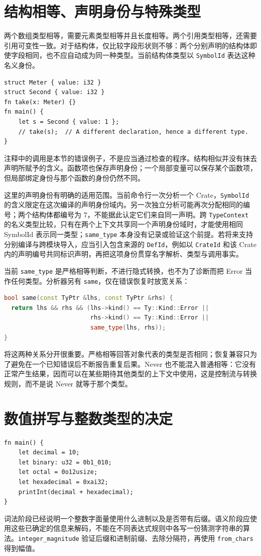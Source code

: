 \section{结构相等、声明身份与特殊类型}
两个数组类型相等，需要元素类型相等并且长度相等。两个引用类型相等，还需要引用可变性一致。对于结构体，仅比较字段形状则不够：两个分别声明的结构体即使字段相同，也不应自动成为同一种类型。当前结构体类型以 \texttt{SymbolId} 表达这种名义身份。

\begin{lstlisting}[language=Rustless]
struct Meter { value: i32 }
struct Second { value: i32 }
fn take(x: Meter) {}
fn main() {
    let s = Second { value: 1 };
    // take(s);  // A different declaration, hence a different type.
}
\end{lstlisting}
注释中的调用是本节的错误例子，不是应当通过检查的程序。结构相似并没有抹去声明所赋予的含义。函数项也保存声明身份；一个局部变量可以保存某个函数项，但局部绑定身份与那个函数的身份仍然不同。

这里的声明身份有明确的适用范围。当前命令行一次分析一个 Crate，\texttt{SymbolId} 的含义限定在这次编译的声明身份域内。另一次独立分析可能再次分配相同的编号；两个结构体都编号为 7，不能据此认定它们来自同一声明。跨 \texttt{TypeContext} 的名义类型比较，只有在两个上下文共享同一个声明身份域时，才能使用相同 SymbolId 表示同一类型；\texttt{same\_type} 本身没有记录或验证这个前提。若将来支持分别编译与跨模块导入，应当引入包含来源的 \texttt{DefId}，例如以 \texttt{CrateId} 和该 Crate 内的声明编号共同标识声明，再把这项身份贯穿名字解析、类型与调用事实。

当前 \texttt{same\_type} 是严格相等判断，不进行隐式转换，也不为了诊断而把 Error 当作任何类型。分析器另有 \texttt{same}，仅在错误恢复时放宽关系：
\begin{lstlisting}[language=C++]
bool same(const TyPtr &lhs, const TyPtr &rhs) {
  return lhs && rhs && (lhs->kind() == Ty::Kind::Error ||
                        rhs->kind() == Ty::Kind::Error ||
                        same_type(lhs, rhs));
}
\end{lstlisting}
将这两种关系分开很重要。严格相等回答对象代表的类型是否相同；恢复兼容只为了避免在一个已知错误后不断报告重复后果。Never 也不能混入普通相等：它没有正常产生结果，因而可以在某些期待其他类型的上下文中使用，这是控制流与转换规则，而不是说 Never 就等于那个类型。

\section{数值拼写与整数类型的决定}
\begin{lstlisting}[language=Rustless]
fn main() {
    let decimal = 10;
    let binary: u32 = 0b1_010;
    let octal = 0o12usize;
    let hexadecimal = 0xai32;
    printInt(decimal + hexadecimal);
}
\end{lstlisting}
词法阶段已经说明一个整数字面量使用什么进制以及是否带有后缀。语义阶段应使用这些已确定的信息来解码，不能在不同表达式规则中各写一份猜测字符串的算法。\texttt{integer\_magnitude} 验证后缀和进制前缀、去除分隔符，再使用 \texttt{from\_chars} 得到幅值。

